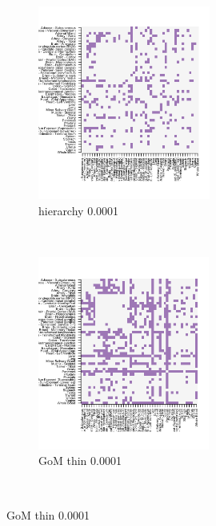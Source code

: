\documentclass[10pt,letterpaper]{article}
\begin{document}
\begin{figure}[ht]
     \begin{subfigure}[t]{0.5\textwidth}
        \centering
        \includegraphics[height=2.5in]{../plots/rsz_1hierarchy_F_thin_0_0001.png}
        \caption{hierarchy 0.0001}
    \end{subfigure}%
    ~
    \begin{subfigure}[t]{0.5\textwidth}
        \centering
        \includegraphics[height=2.5in]{../plots/rsz_1admixture_F_thin_0_0001.png}
        \caption{GoM thin 0.0001}
    \end{subfigure}\\
\end{figure}
\clearpage




\end{document}

